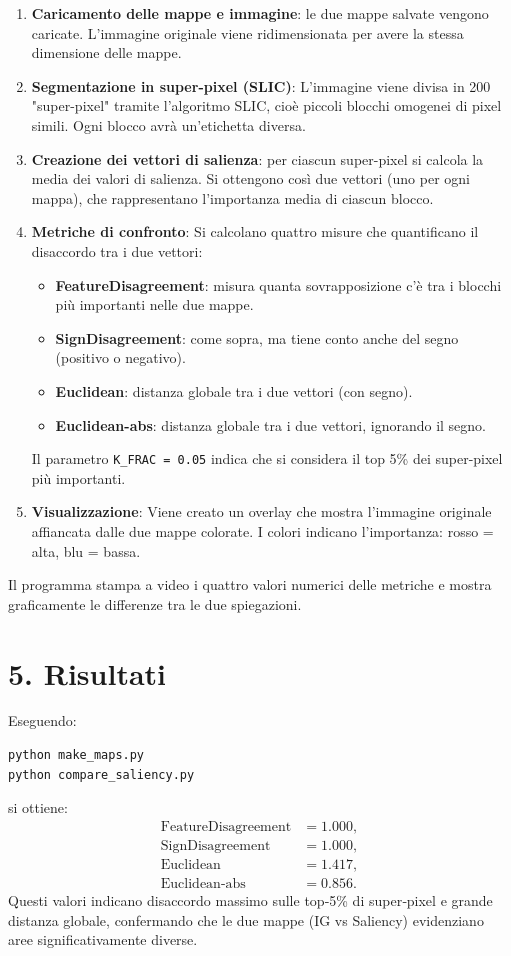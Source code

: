 \documentclass[a4paper,11pt]{article}
\begin{document}
\begin{enumerate}
\item \textbf{Caricamento delle mappe e immagine}: le due mappe salvate vengono caricate. L'immagine originale viene ridimensionata per avere la stessa dimensione delle mappe.

\item \textbf{Segmentazione in super-pixel (SLIC)}:
L'immagine viene divisa in 200 "super-pixel" tramite l'algoritmo SLIC, cioè piccoli blocchi omogenei di pixel simili. Ogni blocco avrà un'etichetta diversa.

\item \textbf{Creazione dei vettori di salienza}: per ciascun super-pixel si calcola la media dei valori di salienza. Si ottengono così due vettori (uno per ogni mappa), che rappresentano l'importanza media di ciascun blocco.

\item \textbf{Metriche di confronto}:
Si calcolano quattro misure che quantificano il disaccordo tra i due vettori:
\begin{itemize}
\item \textbf{FeatureDisagreement}: misura quanta sovrapposizione c'è tra i blocchi più importanti nelle due mappe.
\item \textbf{SignDisagreement}: come sopra, ma tiene conto anche del segno (positivo o negativo).
\item \textbf{Euclidean}: distanza globale tra i due vettori (con segno).
\item \textbf{Euclidean-abs}: distanza globale tra i due vettori, ignorando il segno.
\end{itemize}
Il parametro \texttt{K\_FRAC = 0.05} indica che si considera il top 5\% dei super-pixel più importanti.

\item \textbf{Visualizzazione}:
Viene creato un overlay che mostra l'immagine originale affiancata dalle due mappe colorate. I colori indicano l'importanza: rosso = alta, blu = bassa.
\end{enumerate}

Il programma stampa a video i quattro valori numerici delle metriche e mostra graficamente le differenze tra le due spiegazioni.

\section*{5. Risultati}
Eseguendo:
\begin{verbatim}
python make_maps.py
python compare_saliency.py
\end{verbatim}
si ottiene:
\[
\begin{aligned}
\text{FeatureDisagreement} &= 1.000,\\ 
\text{SignDisagreement}    &= 1.000,\\
\text{Euclidean}           &= 1.417,\\
\text{Euclidean-abs}       &= 0.856.
\end{aligned}
\]
Questi valori indicano disaccordo massimo sulle top‐5\% di super‐pixel e grande distanza globale, confermando che le due mappe (IG vs Saliency) evidenziano aree significativamente diverse.
\end{document}
